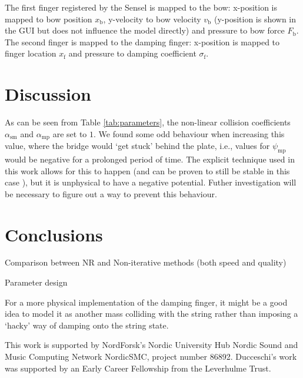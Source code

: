 \documentclass[dvipsnames, pdftex]{article}
\begin{document}
The first finger registered by the Sensel is mapped to the bow: x-position is mapped to bow position $x_\text{b}$, y-velocity to bow velocity $v_\text{b}$ (y-position is shown in the GUI but does not influence the model directly) and pressure to bow force $F_\text{b}$. The second finger is mapped to the damping finger: x-position is mapped to finger location $x_\text{f}$ and pressure to damping coefficient $\sigma_\text{f}$.

\section{Discussion}

As can be seen from Table \ref{tab:parameters}, the non-linear collision coefficients $\alpha_\text{sm}$ and $\alpha_\text{mp}$ are set to $1$. We found some odd behaviour when increasing this value, where the bridge would `get stuck' behind the plate, i.e., values for $\psi_\text{mp}$ would be negative for a prolonged period of time. The explicit technique used in this work allows for this to happen (and can be proven to still be stable in this case \cite{Ducceschi2019}), but it is unphysical to have a negative potential. Futher investigation will be necessary to figure out a way to prevent this behaviour.

\section{Conclusions}
Comparison between NR and Non-iterative methods (both speed and quality)

Parameter design



For a more physical implementation of the damping finger, it might be a good idea to model it as another mass colliding with the string rather than imposing a `hacky' way of damping onto the string state. 
\begin{acknowledgments}
This work is supported by NordForsk's Nordic
University Hub Nordic Sound and Music Computing Network
NordicSMC, project number 86892. Ducceschi's work was supported by an Early Career Fellowship from the Leverhulme Trust.
\end{acknowledgments} 

{\small

}
\end{document}

